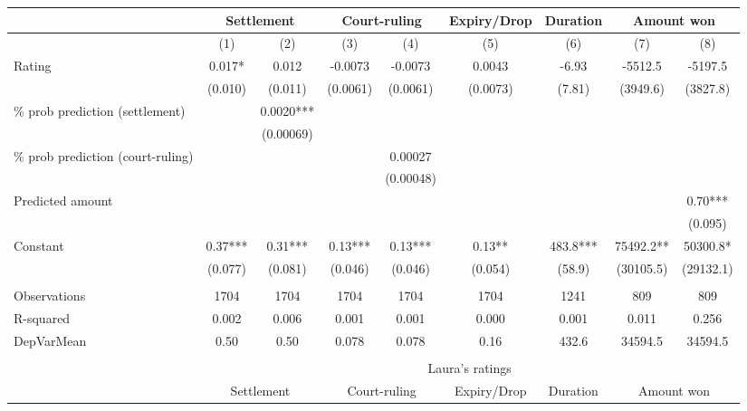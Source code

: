 \begin{tabular}{lcccccccc}
\toprule
      & \multicolumn{2}{c}{Settlement} & \multicolumn{2}{c}{Court-ruling} & Expiry/Drop & Duration & \multicolumn{2}{c}{Amount won} \\
\midrule
      & (1)   & (2)   & (3)   & (4)   & (5)   & (6)   & (7)   & (8) \\
\midrule
\midrule
Rating & 0.017* & 0.012 & -0.0073 & -0.0073 & 0.0043 & -6.93 & -5512.5 & -5197.5 \\
      & (0.010) & (0.011) & (0.0061) & (0.0061) & (0.0073) & (7.81) & (3949.6) & (3827.8) \\
\% prob prediction (settlement) &       & 0.0020*** &       &       &       &       &       &  \\
      &       & (0.00069) &       &       &       &       &       &  \\
\% prob prediction (court-ruling) &       &       &       & 0.00027 &       &       &       &  \\
      &       &       &       & (0.00048) &       &       &       &  \\
Predicted amount &       &       &       &       &       &       &       & 0.70*** \\
      &       &       &       &       &       &       &       & (0.095) \\
Constant & 0.37*** & 0.31*** & 0.13*** & 0.13*** & 0.13** & 483.8*** & 75492.2** & 50300.8* \\
      & (0.077) & (0.081) & (0.046) & (0.046) & (0.054) & (58.9) & (30105.5) & (29132.1) \\
      &       &       &       &       &       &       &       &  \\
\midrule
Observations & 1704  & 1704  & 1704  & 1704  & 1704  & 1241  & 809   & 809 \\
R-squared & 0.002 & 0.006 & 0.001 & 0.001 & 0.000 & 0.001 & 0.011 & 0.256 \\
DepVarMean & 0.50  & 0.50  & 0.078 & 0.078 & 0.16  & 432.6 & 34594.5 & 34594.5 \\
\midrule
\midrule
      &       &       &       &       &       &       &       &  \\
\midrule
      & \multicolumn{8}{c}{Laura's ratings} \\
\midrule
      & \multicolumn{2}{c}{Settlement} & \multicolumn{2}{c}{Court-ruling} & Expiry/Drop & Duration  & \multicolumn{2}{c}{Amount won} \\
\midrule

\end{tabular}
